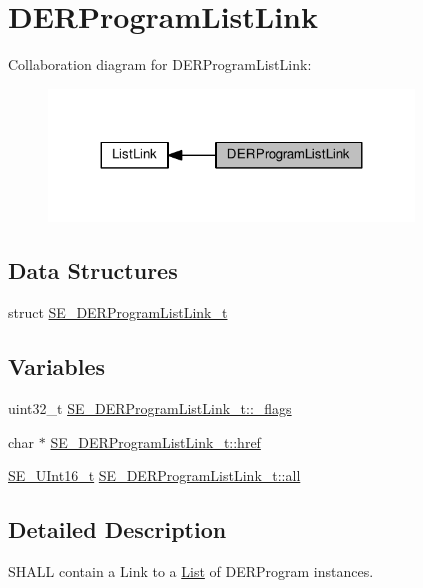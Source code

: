 \hypertarget{group__DERProgramListLink}{}\section{D\+E\+R\+Program\+List\+Link}
\label{group__DERProgramListLink}
Collaboration diagram for D\+E\+R\+Program\+List\+Link\+:\nopagebreak
\begin{figure}[H]
\begin{center}
\leavevmode
\includegraphics[width=275pt]{group__DERProgramListLink}
\end{center}
\end{figure}
\subsection*{Data Structures}
\begin{DoxyCompactItemize}
\item 
struct \hyperlink{structSE__DERProgramListLink__t}{S\+E\+\_\+\+D\+E\+R\+Program\+List\+Link\+\_\+t}
\end{DoxyCompactItemize}
\subsection*{Variables}
\begin{DoxyCompactItemize}
\item 
uint32\+\_\+t \hyperlink{group__DERProgramListLink_ga42a0edb4880deca3d413aa643f18d56c}{S\+E\+\_\+\+D\+E\+R\+Program\+List\+Link\+\_\+t\+::\+\_\+flags}
\item 
char $\ast$ \hyperlink{group__DERProgramListLink_gafbc96a7ac9d21a98c3a38be05f853758}{S\+E\+\_\+\+D\+E\+R\+Program\+List\+Link\+\_\+t\+::href}
\item 
\hyperlink{group__UInt16_gac68d541f189538bfd30cfaa712d20d29}{S\+E\+\_\+\+U\+Int16\+\_\+t} \hyperlink{group__DERProgramListLink_ga18b1991f92601ccd150af4f127efa8cd}{S\+E\+\_\+\+D\+E\+R\+Program\+List\+Link\+\_\+t\+::all}
\end{DoxyCompactItemize}


\subsection{Detailed Description}
S\+H\+A\+LL contain a Link to a \hyperlink{structList}{List} of D\+E\+R\+Program instances. 

